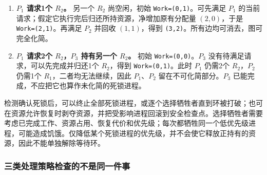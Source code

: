 \begin{enumerate}
\def\labelenumi{\arabic{enumi}.}
\tightlist
\item
  \textbf{\(P_1\) 请求1个 \(R_2\)。} 另一个 \(R_2\) 尚空闲，初始 \texttt{Work=\allowbreak{}(\allowbreak{}0,\allowbreak{}1)\allowbreak{}}。可先满足 \(P_1\) 的当前请求；假定它执行完后归还所持资源，净增加原有分配量 \((2,0)\)，于是 \texttt{Work=\allowbreak{}(\allowbreak{}2,\allowbreak{}1)\allowbreak{}}。再满足 \(P_2\) 并回收 \((1,1)\)，得到 \texttt{(\allowbreak{}3,\allowbreak{}2)\allowbreak{}}。所有边均可消去，图可完全化简。
\item
  \textbf{\(P_1\) 请求2个 \(R_2\)，\(P_3\) 持有另一个 \(R_2\)。} 初始 \texttt{Work=\allowbreak{}(\allowbreak{}0,\allowbreak{}0)\allowbreak{}}。\(P_3\) 没有待满足请求，可以先完成并归还1个 \(R_2\)，得到 \texttt{Work=\allowbreak{}(\allowbreak{}0,\allowbreak{}1)\allowbreak{}}。此时 \(P_1\) 仍需2个 \(R_2\)，\(P_2\) 仍需1个 \(R_1\)，二者均无法继续，因此 \(P_1、P_2\) 留在不可化简部分。\(P_3\) 已能完成，不应把它也算作未化简的死锁进程。
\end{enumerate}

检测确认死锁后，可以终止全部死锁进程，或逐个选择牺牲者直到环被打破；也可在资源允许恢复时剥夺资源，并把受影响进程回滚到安全检查点。选择牺牲者需要考虑已完成工作、资源占用、恢复代价和优先级；每次都牺牲同一个低优先级进程，可能造成饥饿。仅降低某个死锁进程的优先级，并不会使它释放正持有的资源，因此不能单独解除等待环。

\subsubsection{三类处理策略检查的不是同一件事}\label{OS02-auto-29}

